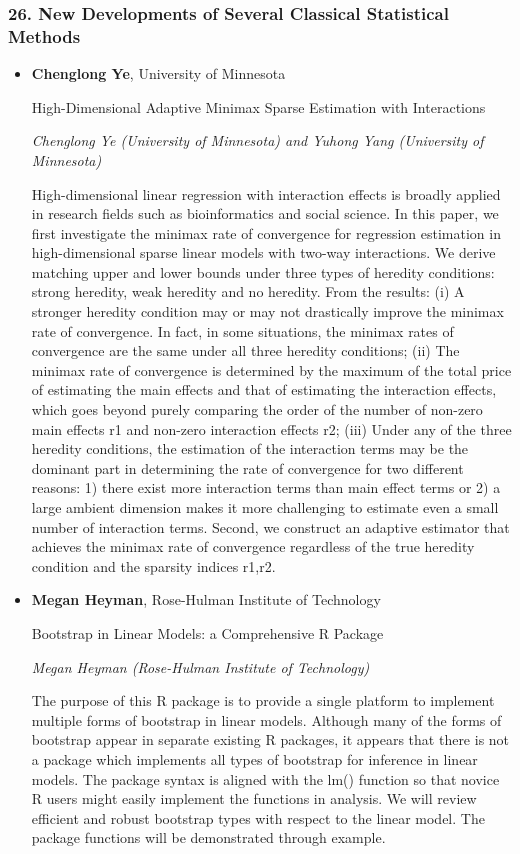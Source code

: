 \subsubsection*{26. New Developments of Several Classical Statistical Methods}

\begin{itemize}
\item \textbf{Chenglong Ye}, University of Minnesota

High-Dimensional Adaptive Minimax Sparse Estimation with Interactions

\emph{\footnotesize Chenglong Ye (University of Minnesota) and Yuhong Yang (University of Minnesota)}

High-dimensional linear regression with interaction effects is broadly applied in research fields such as bioinformatics and social science. In this paper, we first investigate the minimax rate of convergence for regression estimation in high-dimensional sparse linear models with two-way interactions. We derive matching upper and lower bounds under three types of heredity conditions: strong heredity, weak heredity and no heredity. From the results: (i) A stronger heredity condition may or may not drastically improve the minimax rate of convergence. In fact, in some situations, the minimax rates of convergence are the same under all three heredity conditions; (ii) The minimax rate of convergence is determined by the maximum of the total price of estimating the main effects and that of estimating the interaction effects, which goes beyond purely comparing the order of the number of non-zero main effects r1 and non-zero interaction effects r2; (iii) Under any of the three heredity conditions, the estimation of the interaction terms may be the dominant part in determining the rate of convergence for two different reasons: 1) there exist more interaction terms than main effect terms or 2) a large ambient dimension makes it more challenging to estimate even a small number of interaction terms. Second, we construct an adaptive estimator that achieves the minimax rate of convergence regardless of the true heredity condition and the sparsity indices r1,r2.

\item \textbf{Megan Heyman}, Rose-Hulman Institute of Technology

Bootstrap in Linear Models:  a Comprehensive R Package

\emph{\footnotesize Megan Heyman (Rose-Hulman Institute of Technology)}

The purpose of this R package is to provide a single platform to implement multiple forms of bootstrap in linear models.  Although many of the forms of bootstrap appear in separate existing R packages, it appears that there is not a package which implements all types of bootstrap for inference in linear models.  The package syntax is aligned with the lm() function so that novice R users might easily implement the functions in analysis.  We will review efficient and robust bootstrap types with respect to the linear model.  The package functions will be demonstrated through example.


\end{itemize}
